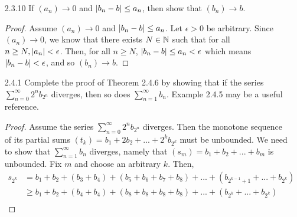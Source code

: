 \documentclass[12pt,letterpaper]{article}
\begin{document}
\begin{itemize}[leftmargin=!,labelindent=5pt]
\begin{proof}
            Next we prove that if $(x_n)$ and $(y_n)$ are both convergent with $\lim x_n = \lim y_n$ then $(z_n)$ is convergent.
            Assume $(x_n)$ and $(y_n)$ are both convergent with $\lim x_n = \lim y_n = l$.
            Let $\epsilon > 0$ be arbitrary.
            Then, we know that there exists an $N_1 \in \bbN$ such that for all $n \geq N_1$, $\abs{x_n - l} < \epsilon$.
            Similarly, we know that there exists an $N_2 \in \bbN$ such that for all $n \geq N_2$, $\abs{y_n - l} < \epsilon$.
            Let $N = $ max $\{2N_1, 2N_2\}$.
            Then, for all $n \geq N$, we have that $\abs{z_n - l} < \epsilon$ since $(z_n)$ consists of alternating elements from $(x_n)$ and $(y_n)$ which means after $N$ both $\abs{x_n - l} < \epsilon$ and $\abs{y_n - l} < \epsilon$.
            Thus, $(z_n)$ is convergent.
        \end{proof}
    \newpage
    \item [2.3.10] If $(a_n) \to 0$ and $\abs{b_n - b} \leq a_n$, then show that $(b_n) \to b$.
        \begin{proof}
            Assume $(a_n) \to 0$ and $\abs{b_n - b} \leq a_n$. 
            Let $\epsilon > 0$ be arbitrary.
            Since $(a_n) \to 0$, we know that there exists $N \in \mathbb{N}$ such that for all $n \geq N, \abs{a_n} < \epsilon$.
            Then, for all $n \geq N$, $\abs{b_n - b} \leq a_n < \epsilon$ which means $\abs{b_n - b} < \epsilon$, and so $(b_n) \to b$.
        \end{proof}
    \item [2.4.1] Complete the proof of Theorem 2.4.6 by showing that if the series $\sum_{n=0}^{\infty}2^nb_{2^n}$ diverges, then so does $\sum_{n=1}^{\infty}b_n$. Example 2.4.5 may be a useful reference.
        \begin{proof}
            Assume the series $\sum_{n=0}^{\infty}2^nb_{2^n}$ diverges.
            Then the monotone sequence of its partial sums $(t_k) = b_1 + 2b_2 + ... + 2^kb_{2^k}$ must be unbounded.
            We need to show that $\sum_{n=1}^{\infty}b_n$ diverges, namely that $(s_m) = b_1 + b_2 + ... + b_m$ is unbounded.
            Fix $m$ and choose an arbitrary $k$.
            Then,
            \begin{align*}
                s_{2^k} &= b_1 + b_2 + (b_3 + b_4) + (b_5 + b_6 + b_7 + b_8) + ... + (b_{2^{k-1}+1} + ... + b_{2^k})\\
                &\geq b_1 + b_2 + (b_4 + b_4) + (b_8 + b_8 + b_8 + b_8) + ... + (b_{2^k} + ... + b_{2^k})\\

\end{align*}
\end{proof}
\end{itemize}
\end{document}
